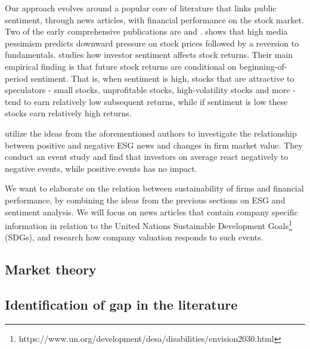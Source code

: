 Our approach evolves around a popular core of literature that links public sentiment, through news articles, with financial performance on the stock market. Two of the early comprehensive publications are \cite{tetlock_sentiment} and \cite{baker_sentiment}. \citeauthor{tetlock_sentiment} shows that high media pessimism predicts downward pressure on stock prices followed by a reversion to fundamentals. \citeauthor{baker_sentiment} studies how investor sentiment affects stock returns. Their main empirical finding is that future stock returns are conditional on beginning-of-period sentiment. That is, when sentiment is high, stocks that are attractive to speculators - small stocks, unprofitable stocks, high-volatility stocks and more - tend to earn relatively low subsequent returns, while if sentiment is low these stocks earn relatively high returns.   

\cite{Blancard_ESG_sentiment} utilize the ideas from the aforementioned authors to investigate the relationship between positive and negative ESG news and changes in firm market value. They conduct an event study and find that investors on average react negatively to negative events, while positive events has no impact. 

We want to elaborate on the relation between sustainability of firms and financial performance, by combining the ideas from the previous sections on ESG and sentiment analysis. We will focus on news articles that contain company specific information in relation to the United Nations Sustainable Development Goals\footnote{https://www.un.org/development/desa/disabilities/envision2030.html} (SDGs), and research how company valuation responds to such events. 



\subsection{Market theory}




\subsection{Identification of gap in the literature}

